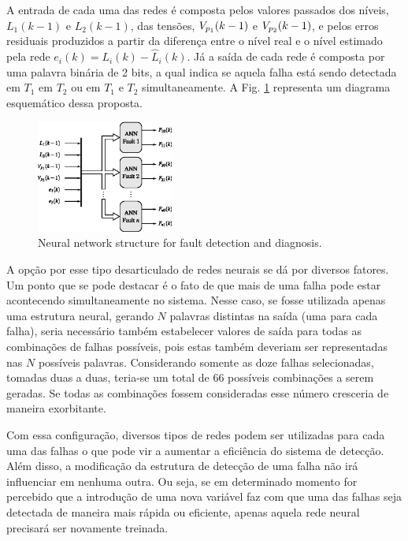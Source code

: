\documentclass[10pt,fleqn,a4paper]{article}
\begin{document}
A entrada de cada uma das redes é composta pelos valores passados dos níveis,
$L_1(k-1)$ e $L_2(k-1)$, das tensões, $V_{p_{\tiny 1}}(k-1)$ e $V_{p_{\tiny
2}}(k-1)$, e pelos erros residuais produzidos a partir da diferença entre o
nível real e o nível estimado pela rede $e_i(k) = L_i(k) - \widehat{L}_i(k)$. Já
a saída de cada rede é composta por uma palavra binária de 2 bits, a qual indica
se aquela falha está sendo detectada em $T_1$ em $T_2$ ou em $T_1$ e $T_2$
simultaneamente. A Fig. \ref{fig:ann_fdd} representa um diagrama esquemático
dessa proposta.

\begin{figure}[htb]
\centering
    \includegraphics[width=0.4\textwidth]{imgs/ann_fdd}
    \caption{Neural network structure for fault detection and diagnosis.}
    \label{fig:ann_fdd}
\end{figure}

A opção por esse tipo desarticulado de redes neurais se dá por diversos fatores.
Um ponto que se pode destacar é o fato de que mais de uma falha pode estar
acontecendo simultaneamente no sistema. Nesse caso, se fosse utilizada apenas
uma estrutura neural, gerando $N$ palavras distintas na saída (uma para cada
falha), seria necessário também estabelecer valores de saída para todas as
combinações de falhas possíveis, pois estas também deveriam ser representadas
nas $N$ possíveis palavras.  Considerando somente as doze falhas selecionadas,
tomadas duas a duas, teria-se um total de 66 possíveis combinações a serem
geradas. Se todas as combinações fossem consideradas esse número cresceria de
maneira exorbitante.

Com essa configuração, diversos tipos de redes podem ser utilizadas para cada
uma das falhas o que pode vir a aumentar a eficiência do sistema de detecção.
Além disso, a modificação da estrutura de detecção de uma falha não
irá influenciar em nenhuma outra. Ou seja, se em determinado momento for
percebido que a introdução de uma nova variável faz com que uma das falhas seja
detectada de maneira mais rápida ou eficiente, apenas aquela rede neural
precisará ser novamente treinada.
\end{document}
